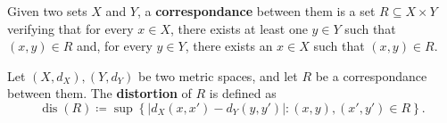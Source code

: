 \begin{definition}
    Given two sets $ X $ and $ Y $, a {\bf correspondance} between them is a set $ R \subseteq X \times Y $ verifying that for every $ x \in X $, there exists at least one $ y \in Y $ such that $(x, y) \in R $ and, for every $ y \in Y $, there exists an $ x \in X $ such that $(x, y) \in R $. 
\end{definition}

\begin{definition}
    Let $ (X, d_X), (Y, d_Y) $ be two metric spaces, and let $ R $ be a correspondance between them. The {\bf distortion} of $ R $ is defined as
    \begin{equation}
        \operatorname{dis}(R) \coloneq \sup \left\{|d_X(x, x') - d_Y(y, y')| \colon (x, y), (x', y') \in R\right\}.
    \end{equation}
\end{definition}

